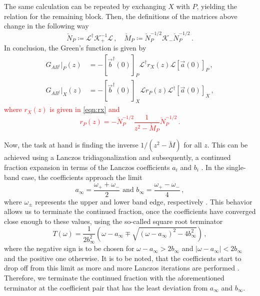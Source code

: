 \documentclass[
    reprint, 
    aps,
    preprintnumbers,
    twocolumn,
    prb,
    superscriptaddress
]{revtex4-2}
\newcommand{\markEdited}{red}
\begin{document}
The same calculation can be repeated by exchanging $X$ with $P$, yielding the relation for the remaining block.
Then, the definitions of the matrices above change in the following way
\begin{equation}
    \check{N}_P \coloneqq \mathcal{L}^\dagger \mathcal{K}_+^{-1} \mathcal{L}\,,\quad \check{M}_P \coloneqq \check{N}_P^{-1/2} \mathcal{K}_- \check{N}_P^{-1/2}\,.
\end{equation}
In conclusion, the Green's function is given by
\begin{subequations}
    \begin{align}
        G_{AB^\dagger} \vert_P (z) &= - \left[ \vec{b}^\dagger (0) \right]_P \mathcal{L}^\dagger r_X (z) \mathcal{L} \left[ \vec{a}(0) \right]_P\,, \\
        G_{AB^\dagger} \vert_X (z) &= - \left[ \vec{b}^\dagger (0) \right]_X \mathcal{L} r_P (z) \mathcal{L}^\dagger \left[ \vec{a}(0) \right]_X\,,
    \end{align}
\end{subequations}
\textcolor{\markEdited}{where $r_X (z)$ is given in \eqref{eqn:rx} and 
\begin{equation}
    r_P (z) = -\check{N}_P^{-1/2} \frac{1}{z^2 - \check{M}_P} \check{N}_P^{-1/2}\,.
\end{equation}}

Now, the task at hand is finding the inverse $1/(z^2 - \check{M})$ for all $z$.
This can be achieved using a Lanczos tridiagonalization and subsequently, a continued fraction expansion in terms of the Lanczos coefficients $a_i$ and $b_i$ \cite{PettiforRecursion,ViswanathRecursion}.
In the single-band case, the coefficients approach the limit
\begin{equation}
    \label{eqn:inf_lanczos}
    a_\infty = \frac{\omega_+ + \omega_-}{2}\text{  and  } b_\infty = \frac{\omega_+ - \omega_-}{4}\,,
\end{equation}
where $\omega_\pm$ represents the upper and lower band edge, respectively \cite{PettiforRecursion}.
This behavior allows us to terminate the continued fraction, once the coefficients have converged close enough to these values, using the so-called square root terminator
\begin{equation}
    T(\omega) = \frac{1}{2b_\infty^2} \left( \omega - a_\infty \mp \sqrt{(\omega - a_\infty)^2 - 4 b_\infty^2} \right)\,,
\end{equation}
where the negative sign is to be chosen for $\omega - a_\infty > 2b_\infty$ and $|\omega - a_\infty| < 2b_\infty$ and the positive one otherwise.
It is to be noted, that the coefficients start to drop off from this limit as more and more Lanczos iterations are performed \cite{ViswanathRecursion}.
Therefore, we terminate the continued fraction with the aforementioned terminator at the coefficient pair that has the least deviation from $a_\infty$ and $b_\infty$.
\end{document}
